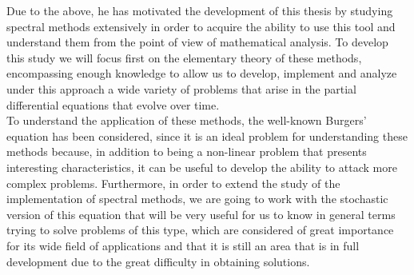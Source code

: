 	Due to the above, he has motivated the development of this thesis by studying spectral methods extensively in order to acquire the ability to use this tool and understand them from the point of view of mathematical analysis. To develop this study we will focus first on the elementary theory of these methods, encompassing enough knowledge to allow us to develop, implement and analyze under this approach a wide variety of problems that arise in the partial differential equations that evolve over time. \\
	
	To understand the application of these methods, the well-known Burgers' equation has been considered, since it is an ideal problem for understanding these methods because, in addition to being a non-linear problem that presents interesting characteristics, it can be useful to develop the ability to attack more complex problems. Furthermore, in order to extend the study of the implementation of spectral methods, we are going to work with the stochastic version of this equation that will be very useful for us to know in general terms trying to solve problems of this type, which are considered of great importance for its wide field of applications and that it is still an area that is in full development due to the great difficulty in obtaining solutions. \\
	
